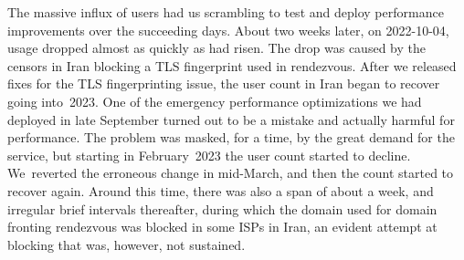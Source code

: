 \documentclass[letterpaper,twocolumn]{article}
\begin{document}
The massive influx of users had us scrambling to test and deploy
performance improvements over the succeeding days.
About two weeks later, on \mbox{2022-10-04},
usage dropped almost as quickly as had risen.
The drop was caused by
the censors in Iran blocking a TLS fingerprint
used in rendezvous.
After we released fixes for the TLS fingerprinting issue,
the user count in Iran began to recover going into~2023.
One of the emergency performance optimizations we had deployed in late September
turned out to be a mistake and actually harmful for performance.
The problem was masked, for a time, by the great demand for the service,
but starting in February~2023 the user count started to decline.
We~reverted the erroneous change in mid-March,
and then the count started to recover again.
Around this time, there was also a span of about a week,
and irregular brief intervals thereafter, during which
the domain used for domain fronting rendezvous
was blocked in some ISPs in Iran,
an evident attempt at blocking that was, however, not sustained.
\end{document}
